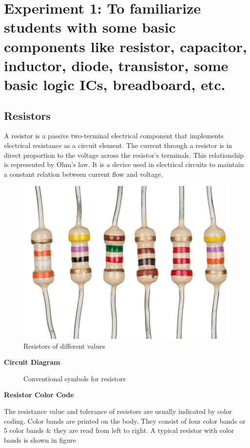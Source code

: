 \section*{Experiment 1: To familiarize students with some basic components like resistor, capacitor, inductor, diode, transistor, some basic logic ICs, breadboard, etc.}  


\subsection*{Resistors}

A resistor is a passive two-terminal electrical component that implements electrical resistance as a circuit element. The current through a resistor is in direct proportion to the voltage across the resistor's terminals. This relationship is represented by Ohm's law. It is a device used in electrical circuits to maintain a constant relation between current flow and voltage. 

\begin{figure}[H]
    \centering
    \includegraphics[width=0.5\linewidth]{img/resistor.png}
    \caption{Resistors of different values}
    \label{fig:resistor}
\end{figure}

\noindent \textbf{Circuit Diagram}

\begin{figure}[H]
    \centering
    
    \caption{Conventional symbols for resistors}
    \label{fig:enter-label}
\end{figure}

\noindent \textbf{Resistor Color Code}

\noindent The resistance value and tolerance of resistors are usually indicated by color coding. Color bands are printed on the body. They consist of four color bands or 5 color bands \& they are read from left to right. A typical resistor with color bands is shown in figure 

